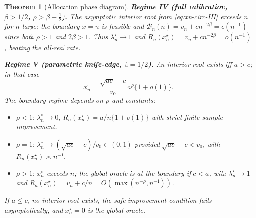 \documentclass[11pt]{article}
\theoremstyle{plain}
\newtheorem{theorem}{Theorem}[section]
\theoremstyle{definition}
\theoremstyle{remark}
\begin{document}
\begin{theorem}[Allocation phase diagram]
\smallskip
\noindent\textbf{Regime IV (full calibration, $\beta>1/2$, $\rho>\beta+\tfrac12$).}
The asymptotic interior root from \cref{eq:xn-circ-III} exceeds $n$ for $n$ large; the boundary $x=n$ is feasible and $\mathcal{B}_n(n)=v_n+cn^{-2\beta}=o(n^{-1})$ since both $\rho>1$ and $2\beta>1$. Thus $\lambda_n^\star\to1$ and $R_n(x_n^\star)=v_n+cn^{-2\beta}=o(n^{-1})$, beating the all-real rate.

\smallskip
\noindent\textbf{Regime V (parametric knife-edge, $\beta=1/2$).}
An interior root exists iff $a>c$; in that case
\begin{equation*}
x_n^\circ=\frac{\sqrt{ac}-c}{v_0}\,n^\rho\bigl\{1+o(1)\bigr\}.
\end{equation*}
The boundary regime depends on $\rho$ and constants:
\begin{itemize}[leftmargin=*]
\item $\rho<1$: $\lambda_n^\circ\to0$, $R_n(x_n^\star)=a/n\{1+o(1)\}$ with strict finite-sample improvement.
\item $\rho=1$: $\lambda_n^\circ\to(\sqrt{ac}-c)/v_0\in(0,1)$ provided $\sqrt{ac}-c<v_0$, with $R_n(x_n^\star)\asymp n^{-1}$.
\item $\rho>1$: $x_n^\circ$ exceeds $n$; the global oracle is at the boundary if $c<a$, with $\lambda_n^\star\to1$ and $R_n(x_n^\star)=v_n+c/n=O(\max(n^{-\rho},n^{-1}))$.
\end{itemize}
If $a\le c$, no interior root exists, the safe-improvement condition fails asymptotically, and $x_n^\star=0$ is the global oracle.
\end{theorem}
\end{document}
